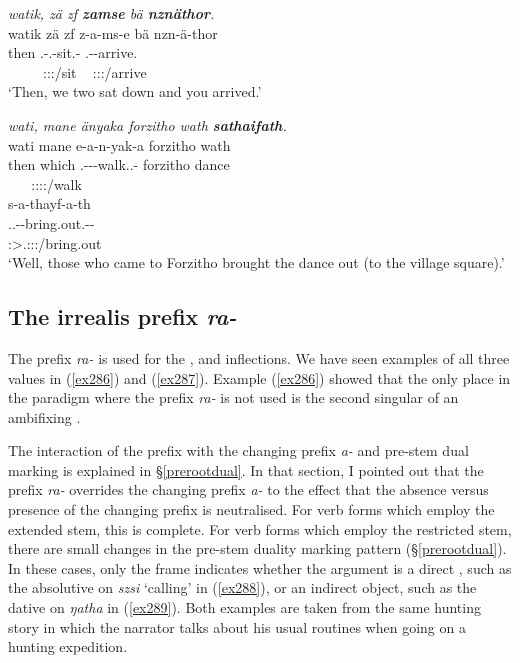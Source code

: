 \begin{exe}
	\ex \emph{watik, zä zf \textbf{zamse} bä \textbf{nznäthor}.}\\
	\glll watik zä zf z-a-ms-e bä nzn-ä-thor\\
	then {\Prox} {\Imm} \M.\Gam-\Vc.\Du-sit.\Rs-{\Fnsg} \Ssg{} \Ssg.\Gam-\Ndu-arrive.\Rs\\
	~ ~ ~ {\footnotesize \Fdu:\Sbj:\Rpst:\Pfv/sit} ~ {\footnotesize \Ssg:\Sbj:\Rpst:\Pfv/arrive}\\
	\trans `Then, we two sat down and you arrived.' 
	\label{ex281}
\end{exe}
\begin{exe}
	\ex \emph{wati, mane änyaka forzitho wath \textbf{sathaifath}.}\\
	\glll wati mane e-a-n-yak-a forzitho wath\\
	then which \Stnsg.\Alph-\Vc-\Venit-walk.\Ext.\Ndu-\Pst{} forzitho dance\\
	~ ~ {\footnotesize \Stpl:\Sbj:\Pst:\Ipfv:\Venit/walk} ~ ~\\
	\sn
	\glll s-a-thayf-a-th\\
	 \Tsg.\Masc.\Gam-\Ndu-bring.out.\Rs-\Pst-\Stnsg\\
	 {\footnotesize \Stpl:\Sbj>\Tsg.\Masc:\Obj:\Pst:\Pfv/bring.out}\\
	\trans `Well, those who came to Forzitho brought the dance out (to the village square).' 
	\label{ex282}
\end{exe}

\subsection{The irrealis prefix \emph{ra-}} \label{irrealisra}

The  prefix \emph{ra-} is used for the ,  and   inflections. We have seen examples of all three  values in (\ref{ex286}) and (\ref{ex287}). Example (\ref{ex286}) showed that the only place in the paradigm where the  prefix \emph{ra-} is not used is the second  singular of an ambifixing .

The interaction of the  prefix with the  changing prefix \emph{a-} and pre-stem dual marking is explained in {\S}\ref{prerootdual}. In that section, I pointed out that the  prefix \emph{ra-} overrides the  changing prefix \emph{a-} to the effect that the absence versus presence of the  changing prefix is neutralised. For verb forms which employ the extended stem, this  is complete. For verb forms which employ the restricted stem, there are small changes in the pre-stem duality marking pattern ({\S}\ref{prerootdual}).  In these cases, only the  frame indicates whether the  argument is a direct , such as the absolutive  on \emph{szsi} `calling' in (\ref{ex288}), or an indirect object, such as the dative  on \emph{ŋatha} in (\ref{ex289}). Both examples are taken from the same hunting story in which the narrator talks about his usual routines when going on a hunting expedition.

